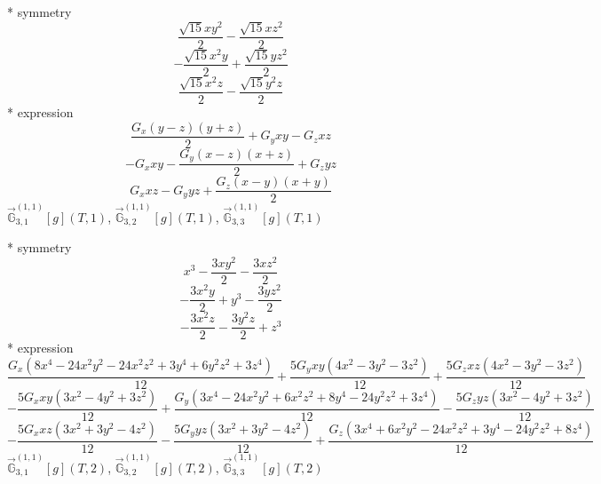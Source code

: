 \documentclass[fleqn,8pt]{jsarticle}
\begin{document}
\noindent\quad ** symmetry
\begin{dmath*}
\frac{\sqrt{15} x y^{2}}{2} - \frac{\sqrt{15} x z^{2}}{2}
\end{dmath*}
\begin{dmath*}
- \frac{\sqrt{15} x^{2} y}{2} + \frac{\sqrt{15} y z^{2}}{2}
\end{dmath*}
\begin{dmath*}
\frac{\sqrt{15} x^{2} z}{2} - \frac{\sqrt{15} y^{2} z}{2}
\end{dmath*}
\noindent\quad ** expression
\begin{dmath*}
\frac{G_{x} \left(y - z\right) \left(y + z\right)}{2} + G_{y} x y - G_{z} x z
\end{dmath*}
\begin{dmath*}
- G_{x} x y - \frac{G_{y} \left(x - z\right) \left(x + z\right)}{2} + G_{z} y z
\end{dmath*}
\begin{dmath*}
G_{x} x z - G_{y} y z + \frac{G_{z} \left(x - y\right) \left(x + y\right)}{2}
\end{dmath*}
\noindent\quad $\vec{\mathbb{G}}_{3,1}^{(1,1)}[g](T,1)$, $\vec{\mathbb{G}}_{3,2}^{(1,1)}[g](T,1)$, $\vec{\mathbb{G}}_{3,3}^{(1,1)}[g](T,1)$

\noindent\quad ** symmetry
\begin{dmath*}
x^{3} - \frac{3 x y^{2}}{2} - \frac{3 x z^{2}}{2}
\end{dmath*}
\begin{dmath*}
- \frac{3 x^{2} y}{2} + y^{3} - \frac{3 y z^{2}}{2}
\end{dmath*}
\begin{dmath*}
- \frac{3 x^{2} z}{2} - \frac{3 y^{2} z}{2} + z^{3}
\end{dmath*}
\noindent\quad ** expression
\begin{dmath*}
\frac{G_{x} \left(8 x^{4} - 24 x^{2} y^{2} - 24 x^{2} z^{2} + 3 y^{4} + 6 y^{2} z^{2} + 3 z^{4}\right)}{12} + \frac{5 G_{y} x y \left(4 x^{2} - 3 y^{2} - 3 z^{2}\right)}{12} + \frac{5 G_{z} x z \left(4 x^{2} - 3 y^{2} - 3 z^{2}\right)}{12}
\end{dmath*}
\begin{dmath*}
- \frac{5 G_{x} x y \left(3 x^{2} - 4 y^{2} + 3 z^{2}\right)}{12} + \frac{G_{y} \left(3 x^{4} - 24 x^{2} y^{2} + 6 x^{2} z^{2} + 8 y^{4} - 24 y^{2} z^{2} + 3 z^{4}\right)}{12} - \frac{5 G_{z} y z \left(3 x^{2} - 4 y^{2} + 3 z^{2}\right)}{12}
\end{dmath*}
\begin{dmath*}
- \frac{5 G_{x} x z \left(3 x^{2} + 3 y^{2} - 4 z^{2}\right)}{12} - \frac{5 G_{y} y z \left(3 x^{2} + 3 y^{2} - 4 z^{2}\right)}{12} + \frac{G_{z} \left(3 x^{4} + 6 x^{2} y^{2} - 24 x^{2} z^{2} + 3 y^{4} - 24 y^{2} z^{2} + 8 z^{4}\right)}{12}
\end{dmath*}
\noindent\quad $\vec{\mathbb{G}}_{3,1}^{(1,1)}[g](T,2)$, $\vec{\mathbb{G}}_{3,2}^{(1,1)}[g](T,2)$, $\vec{\mathbb{G}}_{3,3}^{(1,1)}[g](T,2)$
\end{document}
